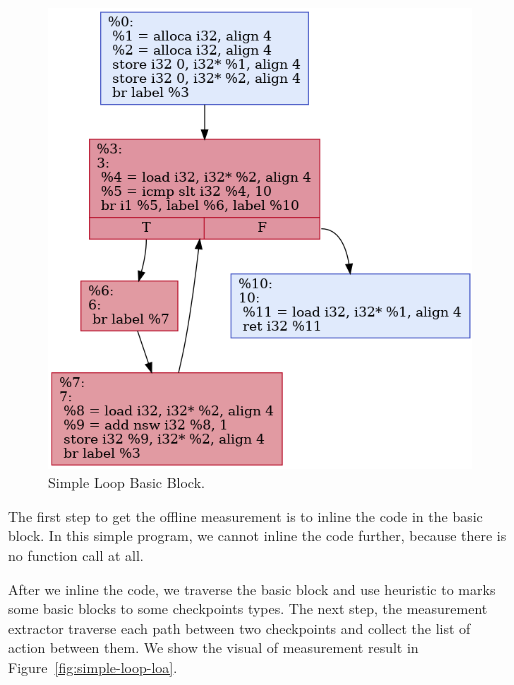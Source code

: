\begin{figure}[t]
    \centerline{\includegraphics[scale=.60]{Figures/05/simple-loop.png}}
    \caption{Simple Loop Basic Block.} 
    \label{fig:simple-loop-bb}
\end{figure}

The first step to get the offline measurement is to inline the code in the basic
block. In this simple program, we cannot inline the code further, because there
is no function call at all. 

After we inline the code, we traverse the basic block and use heuristic to
marks some basic blocks to some checkpoints types. The next step, the
measurement extractor traverse each path between two checkpoints and collect the
list of action between them. We show the visual of measurement result in
Figure~\ref{fig:simple-loop-loa}.

